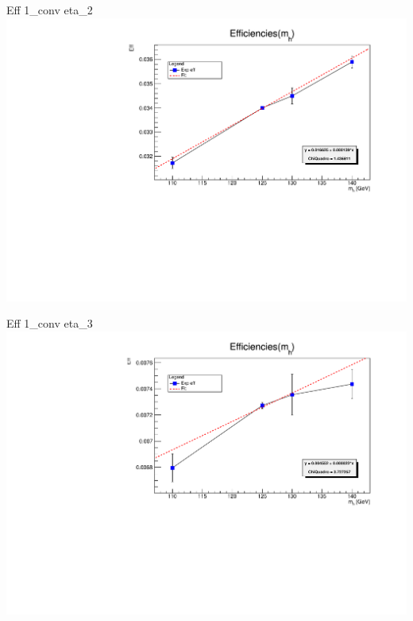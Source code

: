 \documentclass[10pt,UKenglish, leqno, xcolor = dvipsnames]{beamer}
\begin{document}
		\begin{frame}{Eff 1\_conv eta\_2}
			\vfill
			\includegraphics[width=1.\textwidth]{../images/week_9/efficiencies_fit_1_conv_eta_2.pdf}
			\vfill
		\end{frame}
	
		\begin{frame}{Eff 1\_conv eta\_3}
			\vfill
			\includegraphics[width=1.\textwidth]{../images/week_9/efficiencies_fit_1_conv_eta_3.pdf}
			\vfill
		\end{frame}
	
\end{document}
